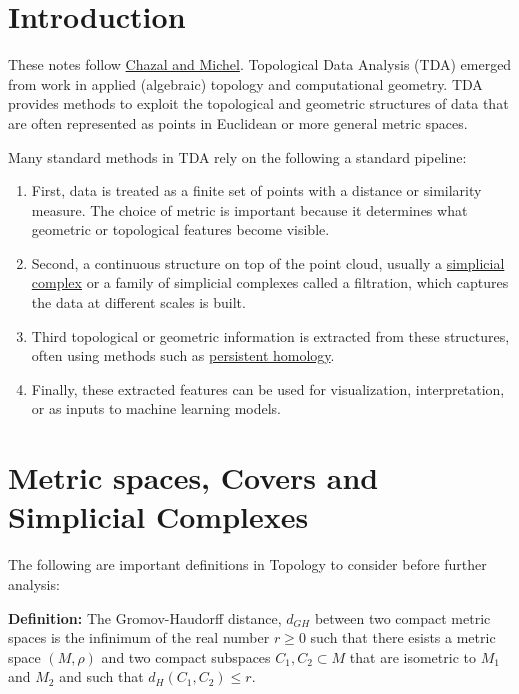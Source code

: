 \documentclass{article}
\begin{document}
\section{Introduction}

These notes follow \href{https://arxiv.org/abs/1710.04019}{Chazal and Michel}. Topological Data Analysis (TDA) emerged from work in applied (algebraic) topology and computational geometry. TDA provides methods to exploit the topological and geometric structures of data that are often represented as points in Euclidean or more general metric spaces. 

Many standard methods in TDA rely on the following a standard pipeline:

\begin{enumerate}
    \item First, data is treated as a finite set of points with a distance or similarity measure. The choice of metric is important because it determines what geometric or topological features become visible.

    \item Second, a continuous structure on top of the point cloud, usually a \href{https://en.wikipedia.org/wiki/Simplicial_complex}{simplicial complex} or a family of simplicial complexes called a filtration, which captures the data at different scales is built. 

    \item Third topological or geometric information is extracted from these structures, often using methods such as \href{https://en.wikipedia.org/wiki/Persistent_homology}{persistent homology}.

    \item Finally, these extracted features can be used for visualization, interpretation, or as inputs to machine learning models.
\end{enumerate}

\section{Metric spaces, Covers and Simplicial Complexes}

The following are important definitions in Topology to consider before further analysis:

\textbf{Definition:} The Gromov-Haudorff distance, $d_{GH}$ between two compact metric spaces is the infinimum of the real number $r\geq 0$ such that there esists a metric space $(M,\rho)$ and two compact subspaces $C_1,C_2\subset M$ that are isometric to $M_1$ and $M_2$ and such that $d_H(C_1,C_2) \leq r$.
\end{document}
